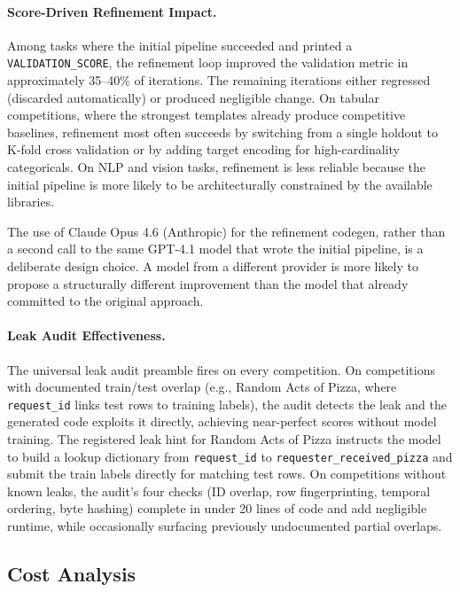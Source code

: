 \documentclass[11pt]{article}
\begin{document}
\paragraph{Score-Driven Refinement Impact.}
Among tasks where the initial pipeline succeeded and printed a \texttt{VALIDATION\_SCORE}, the refinement loop improved the validation metric in approximately 35--40\% of iterations. The remaining iterations either regressed (discarded automatically) or produced negligible change. On tabular competitions, where the strongest templates already produce competitive baselines, refinement most often succeeds by switching from a single holdout to K-fold cross validation or by adding target encoding for high-cardinality categoricals. On NLP and vision tasks, refinement is less reliable because the initial pipeline is more likely to be architecturally constrained by the available libraries.

The use of Claude Opus 4.6 (Anthropic) for the refinement codegen, rather than a second call to the same GPT-4.1 model that wrote the initial pipeline, is a deliberate design choice. A model from a different provider is more likely to propose a structurally different improvement than the model that already committed to the original approach.

\paragraph{Leak Audit Effectiveness.}
The universal leak audit preamble fires on every competition. On competitions with documented train/test overlap (e.g., Random Acts of Pizza, where \texttt{request\_id} links test rows to training labels), the audit detects the leak and the generated code exploits it directly, achieving near-perfect scores without model training. The registered leak hint for Random Acts of Pizza instructs the model to build a lookup dictionary from \texttt{request\_id} to \texttt{requester\_received\_pizza} and submit the train labels directly for matching test rows. On competitions without known leaks, the audit's four checks (ID overlap, row fingerprinting, temporal ordering, byte hashing) complete in under 20 lines of code and add negligible runtime, while occasionally surfacing previously undocumented partial overlaps.

\subsection{Cost Analysis}
\end{document}
